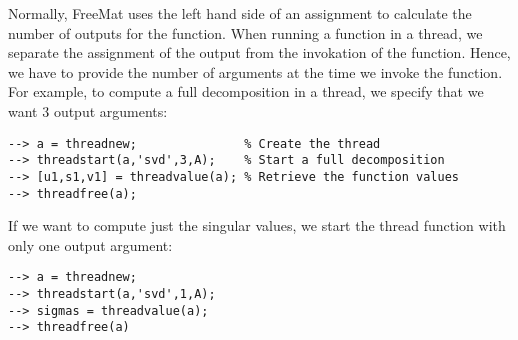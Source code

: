 Normally, FreeMat uses the left hand side of an assignment to calculate
the number of outputs for the function.  When running a function in a
thread, we separate the assignment of the output from the invokation
of the function.  Hence, we have to provide the number of arguments at the
time we invoke the function.  For example, to compute a full decomposition
in a thread, we specify that we want 3 output arguments:
\begin{verbatim}
--> a = threadnew;               % Create the thread
--> threadstart(a,'svd',3,A);    % Start a full decomposition 
--> [u1,s1,v1] = threadvalue(a); % Retrieve the function values
--> threadfree(a);
\end{verbatim}
If we want to compute just the singular values, we start the thread
function with only one output argument:
\begin{verbatim}
--> a = threadnew;
--> threadstart(a,'svd',1,A);
--> sigmas = threadvalue(a);
--> threadfree(a)
\end{verbatim}

